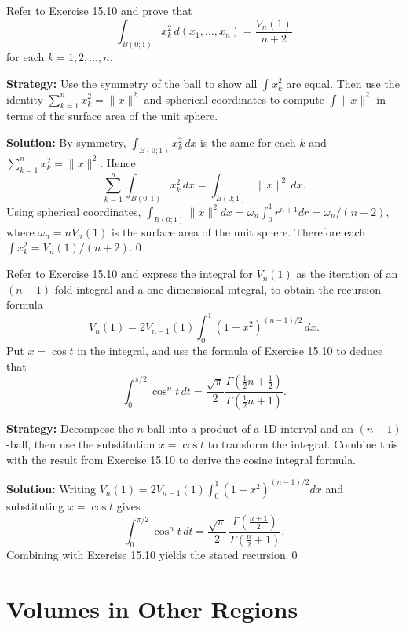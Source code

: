 \begin{problembox}
Refer to Exercise 15.10 and prove that
\[
\int_{B(0;1)} x_k^2 \, d(x_1, \ldots, x_n) = \frac{V_n(1)}{n + 2}
\]
for each \( k = 1, 2, \ldots, n \).
\end{problembox}

\noindent\textbf{Strategy:} Use the symmetry of the ball to show all \(\int x_k^2\) are equal. Then use the identity \(\sum_{k=1}^n x_k^2 = \|x\|^2\) and spherical coordinates to compute \(\int \|x\|^2\) in terms of the surface area of the unit sphere.

\bigskip\noindent\textbf{Solution:}
By symmetry, \(\int_{B(0;1)} x_k^2\,dx\) is the same for each \(k\) and \(\sum_{k=1}^n x_k^2=\|x\|^2\). Hence
\[
\sum_{k=1}^n \int_{B(0;1)} x_k^2\,dx = \int_{B(0;1)} \|x\|^2\,dx.
\]
Using spherical coordinates, \(\int_{B(0;1)} \|x\|^2 dx = \omega_{n}\int_0^1 r^{n+1}dr=\omega_n/(n+2)\), where \(\omega_n= n V_n(1)\) is the surface area of the unit sphere. Therefore each \(\int x_k^2 = V_n(1)/(n+2)\).\qed


\begin{problembox}
Refer to Exercise 15.10 and express the integral for \( V_n(1) \) as the iteration of an \( (n - 1) \)-fold integral and a one-dimensional integral, to obtain the recursion formula
\[
V_n(1) = 2V_{n-1}(1) \int_0^1 (1 - x^2)^{(n-1)/2} \, dx.
\]
Put \( x = \cos t \) in the integral, and use the formula of Exercise 15.10 to deduce that
\[
\int_0^{\pi/2} \cos^n t \, dt = \frac{\sqrt{\pi}}{2} \frac{\Gamma(\frac{1}{2}n + \frac{1}{2})}{\Gamma(\frac{1}{2}n + 1)}.
\]
\end{problembox}

\noindent\textbf{Strategy:} Decompose the \(n\)-ball into a product of a 1D interval and an \((n-1)\)-ball, then use the substitution \(x = \cos t\) to transform the integral. Combine this with the result from Exercise 15.10 to derive the cosine integral formula.

\bigskip\noindent\textbf{Solution:}
Writing \(V_n(1)=2V_{n-1}(1)\int_0^1 (1-x^2)^{(n-1)/2}dx\) and substituting \(x=\cos t\) gives
\[
\int_0^{\pi/2} \cos^n t\,dt = \frac{\sqrt{\pi}}{2}\,\frac{\Gamma(\tfrac{n+1}{2})}{\Gamma(\tfrac{n}{2}+1)}.
\]
Combining with Exercise 15.10 yields the stated recursion.\qed
\section{Volumes in Other Regions}

